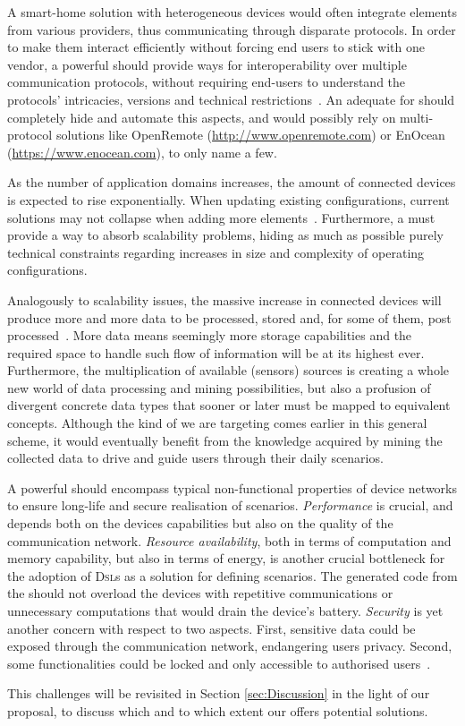 \begin{description}[leftmargin=0cm]
	\item[Protocol Interoperability] A smart-home solution with heterogeneous devices would often integrate elements from various providers, thus communicating through disparate protocols. In order to make them interact efficiently without forcing end users to stick with one vendor, a powerful \DSL should provide ways for interoperability over multiple communication protocols, without requiring end-users to understand the protocols' intricacies, versions and technical restrictions~\cite{gubbi-13}. An adequate \DSL for \IOT should completely hide and automate this aspects, and would possibly rely on multi-protocol solutions like OpenRemote (\url{http://www.openremote.com}) or EnOcean (\url{https://www.enocean.com}), to only name a few. 
	
	\item[Scalability] As the number of application domains increases, the amount of connected devices is expected to rise exponentially. When updating existing \IOT configurations, current solutions may not collapse when adding more elements~\cite{mukho-14}. Furthermore, a \DSL must provide a way to absorb scalability problems, hiding as much as possible purely technical constraints regarding increases in size and complexity of operating configurations. 
	
	\item[Data Management] Analogously to scalability issues, the massive increase in connected devices will produce more and more data to be processed, stored and, for some of them, post processed~\cite{lee-15}. More data means seemingly more storage capabilities and the required space to handle such flow of information will be at its highest ever. Furthermore, the multiplication of available (sensors) sources is creating a whole new world of data processing and mining possibilities, but also a profusion of divergent concrete data types that sooner or later must be mapped to equivalent concepts. Although the kind of \DSL we are targeting comes earlier in this general scheme, it would eventually benefit from the knowledge acquired by mining the collected data to drive and guide users through their daily scenarios.
	
	\item[Non-Functional Properties] A powerful \DSL should encompass typical non-functional properties of device networks to ensure long-life and secure realisation of scenarios. \emph{Performance} is crucial, and depends both on the devices capabilities but also on the quality of the communication network. \emph{Resource availability}, both in terms of computation and memory capability, but also in terms of energy, is another crucial bottleneck for the adoption of \textsc{Dsl}s as a solution for defining scenarios. The generated code from the \DSL should not overload the devices with repetitive communications or unnecessary computations that would drain the device's battery. \emph{Security} is yet another concern with respect to two aspects. First, sensitive data could be exposed through the communication network, endangering users privacy. Second, some functionalities could be locked and only accessible to authorised users~\cite{tan-10}.
\end{description}
This challenges will be revisited in Section \ref{sec:Discussion} in the light of our proposal, to discuss which and to which extent our \DSL offers potential solutions.
